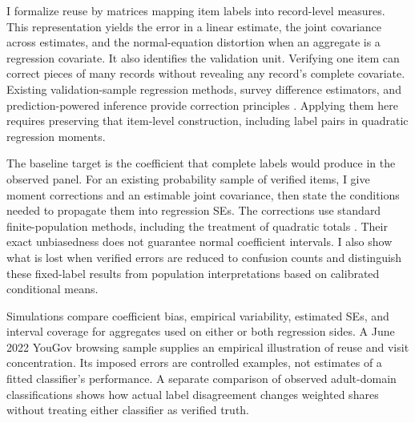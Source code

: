 I formalize reuse by matrices mapping item labels into record-level measures.
This representation yields the error in a linear estimate, the joint
covariance across estimates, and the normal-equation distortion when an
aggregate is a regression covariate. It also identifies the validation unit.
Verifying one item can correct pieces of many records without revealing any
record's complete covariate. Existing validation-sample regression methods,
survey difference estimators, and prediction-powered inference provide
correction principles
\citep{shepherd2012audit,lumley2011calibration,angelopoulos2023ppi,egami2023,
kluger2025imputed}. Applying them here requires preserving that item-level
construction, including label pairs in quadratic regression moments.

The baseline target is the coefficient that complete labels would produce
in the observed panel. For an existing probability sample of verified items,
I give moment corrections and an estimable joint covariance, then state the
conditions needed to propagate them into regression SEs. The corrections use
standard finite-population methods, including the treatment of quadratic
totals \citep{sitter2002quadratic}. Their exact unbiasedness does not guarantee
normal coefficient intervals. I also show what is lost when verified errors
are reduced to confusion counts and distinguish these fixed-label results
from population interpretations based on calibrated conditional means.

Simulations compare coefficient bias, empirical variability, estimated SEs,
and interval coverage for aggregates used on either or both regression sides.
A June 2022 YouGov browsing sample supplies an empirical illustration of
reuse and visit concentration. Its imposed errors are controlled examples,
not estimates of a fitted classifier's performance. A separate comparison of
observed adult-domain classifications shows how actual label disagreement
changes weighted shares without treating either classifier as verified truth.
